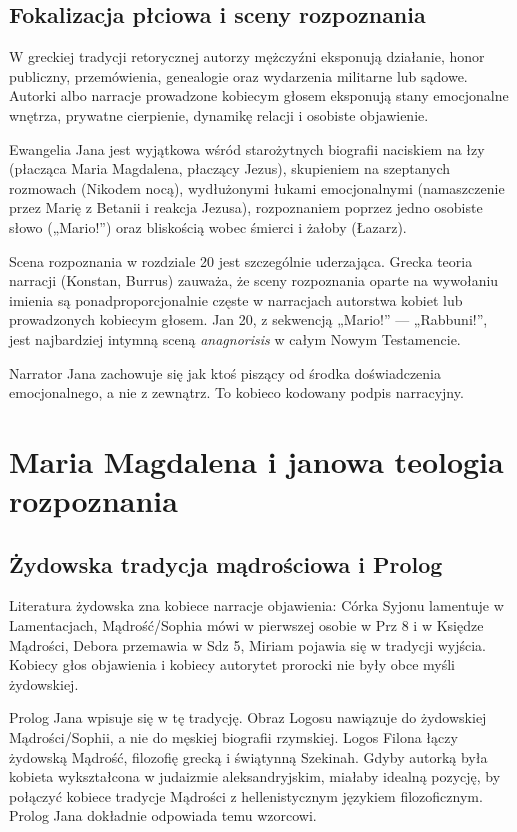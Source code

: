 \subsection{Fokalizacja płciowa i sceny rozpoznania}\label{subsec:gendered-focalization}

W greckiej tradycji retorycznej autorzy mężczyźni eksponują działanie, honor publiczny, przemówienia, genealogie oraz wydarzenia militarne lub sądowe.
Autorki albo narracje prowadzone kobiecym głosem eksponują stany emocjonalne wnętrza, prywatne cierpienie, dynamikę relacji i osobiste objawienie.

Ewangelia Jana jest wyjątkowa wśród starożytnych biografii naciskiem na łzy (płacząca Maria Magdalena, płaczący Jezus), skupieniem na szeptanych rozmowach (Nikodem nocą), wydłużonymi łukami emocjonalnymi (namaszczenie przez Marię z Betanii i reakcja Jezusa), rozpoznaniem poprzez jedno osobiste słowo („Mario!”) oraz bliskością wobec śmierci i żałoby (Łazarz).

Scena rozpoznania w rozdziale 20 jest szczególnie uderzająca.
Grecka teoria narracji (Konstan, Burrus) zauważa, że sceny rozpoznania oparte na wywołaniu imienia są ponadproporcjonalnie częste w narracjach autorstwa kobiet lub prowadzonych kobiecym głosem.
Jan 20, z sekwencją „Mario!” — „Rabbuni!”, jest najbardziej intymną sceną \textit{anagnorisis} w całym Nowym Testamencie.

Narrator Jana zachowuje się jak ktoś piszący od środka doświadczenia emocjonalnego, a nie z zewnątrz.
To kobieco kodowany podpis narracyjny.

\section{Maria Magdalena i janowa teologia rozpoznania}\label{sec:johannine-theology-recognition}

\subsection{Żydowska tradycja mądrościowa i Prolog}\label{subsec:jewish-wisdom-tradition}

Literatura żydowska zna kobiece narracje objawienia:
Córka Syjonu lamentuje w Lamentacjach, Mądrość/Sophia mówi w pierwszej osobie w Prz 8 i w Księdze Mądrości, Debora przemawia w Sdz 5, Miriam pojawia się w tradycji wyjścia.
Kobiecy głos objawienia i kobiecy autorytet prorocki nie były obce myśli żydowskiej.

Prolog Jana wpisuje się w tę tradycję.
Obraz Logosu nawiązuje do żydowskiej Mądrości/Sophii, a nie do męskiej biografii rzymskiej.
Logos Filona łączy żydowską Mądrość, filozofię grecką i świątynną Szekinah.
Gdyby autorką była kobieta wykształcona w judaizmie aleksandryjskim, miałaby idealną pozycję, by połączyć kobiece tradycje Mądrości z hellenistycznym językiem filozoficznym.
Prolog Jana dokładnie odpowiada temu wzorcowi.


